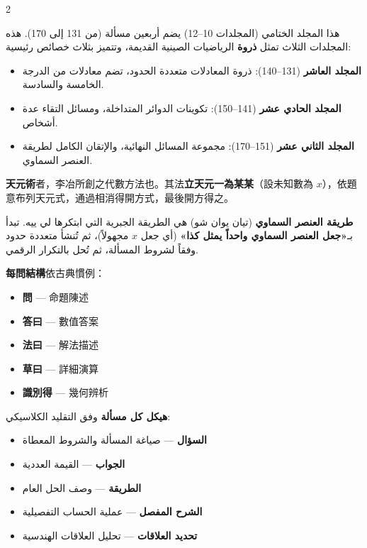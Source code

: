 \documentclass[11pt,a4paper]{article}
\newcommand{\ar}[1]{\arabicfont\beginR #1\endR}
\newcommand{\arnote}[1]{\textcolor{arabicblue}{\ar{#1}}}
\begin{document}
\begin{paracol}{2}
\begin{rightcolumn}
\arnote{هذا المجلد الختامي (المجلدات 10--12) يضم أربعين مسألة (من 131 إلى 170). هذه المجلدات الثلاث تمثل \textbf{ذروة} الرياضيات الصينية القديمة، وتتميز بثلاث خصائص رئيسية:}

\begin{itemize}[leftmargin=1.5em,topsep=0pt]
  \item \arnote{\textbf{المجلد العاشر} (131--140): ذروة المعادلات متعددة الحدود، تضم معادلات من الدرجة الخامسة والسادسة.}
  \item \arnote{\textbf{المجلد الحادي عشر} (141--150): تكوينات الدوائر المتداخلة، ومسائل التقاء عدة أشخاص.}
  \item \arnote{\textbf{المجلد الثاني عشر} (151--170): مجموعة المسائل النهائية، والإتقان الكامل لطريقة العنصر السماوي.}
\end{itemize}
\end{rightcolumn}

\switchcolumn

\begin{leftcolumn}
\textbf{天元術}者，李冶所創之代數方法也。其法\textbf{立天元一為某某}（設未知數為 $x$），依題意布列天元式，通過相消得開方式，最後開方得之。
\end{leftcolumn}

\begin{rightcolumn}
\arnote{\textbf{طريقة العنصر السماوي} (تيان يوان شو) هي الطريقة الجبرية التي ابتكرها لي ييه. تبدأ بـ\textbf{«جعل العنصر السماوي واحداً يمثل كذا»} (أي جعل $x$ مجهولاً)، ثم تُنشأ متعددة حدود وفقاً لشروط المسألة، ثم تُحل بالتكرار الرقمي.}
\end{rightcolumn}

\switchcolumn

\begin{leftcolumn}
\textbf{每問結構}依古典慣例：
\begin{itemize}[leftmargin=1.5em,topsep=0pt]
  \item \textbf{問} --- 命題陳述
  \item \textbf{答曰} --- 數值答案
  \item \textbf{法曰} --- 解法描述
  \item \textbf{草曰} --- 詳細演算
  \item \textbf{識別得} --- 幾何辨析
\end{itemize}
\end{leftcolumn}

\begin{rightcolumn}
\arnote{\textbf{هيكل كل مسألة} وفق التقليد الكلاسيكي:}
\begin{itemize}[leftmargin=1.5em,topsep=0pt]
  \item \arnote{\textbf{السؤال} — صياغة المسألة والشروط المعطاة}
  \item \arnote{\textbf{الجواب} — القيمة العددية}
  \item \arnote{\textbf{الطريقة} — وصف الحل العام}
  \item \arnote{\textbf{الشرح المفصل} — عملية الحساب التفصيلية}
  \item \arnote{\textbf{تحديد العلاقات} — تحليل العلاقات الهندسية}
\end{itemize}
\end{rightcolumn}


\end{paracol}
\end{document}
